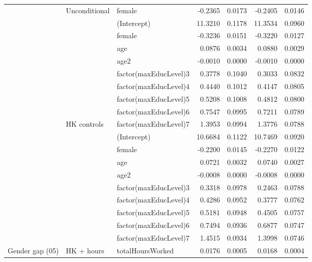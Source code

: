 \begin{table}[H]
{\begin{tabular}[t]{lllrrrr}
 & \multirow{-2}{*}[\normalbaselineskip]{\raggedright\arraybackslash Unconditional} & female & -0.2365 & 0.0173 & -0.2405 & 0.0146\\

 &  & (Intercept) & 11.3210 & 0.1178 & 11.3534 & 0.0960\\

 &  & female & -0.3236 & 0.0151 & -0.3220 & 0.0127\\

 &  & age & 0.0876 & 0.0034 & 0.0880 & 0.0029\\

 &  & age2 & -0.0010 & 0.0000 & -0.0010 & 0.0000\\

 &  & factor(maxEducLevel)3 & 0.3778 & 0.1040 & 0.3033 & 0.0832\\

 &  & factor(maxEducLevel)4 & 0.4440 & 0.1012 & 0.4147 & 0.0805\\

 &  & factor(maxEducLevel)5 & 0.5208 & 0.1008 & 0.4812 & 0.0800\\

 &  & factor(maxEducLevel)6 & 0.7547 & 0.0995 & 0.7211 & 0.0789\\

 & \multirow{-9}{*}[\normalbaselineskip]{\raggedright\arraybackslash HK controls} & factor(maxEducLevel)7 & 1.3953 & 0.0994 & 1.3776 & 0.0788\\

 &  & (Intercept) & 10.6684 & 0.1122 & 10.7469 & 0.0920\\

 &  & female & -0.2200 & 0.0145 & -0.2270 & 0.0122\\

 &  & age & 0.0721 & 0.0032 & 0.0740 & 0.0027\\

 &  & age2 & -0.0008 & 0.0000 & -0.0008 & 0.0000\\

 &  & factor(maxEducLevel)3 & 0.3318 & 0.0978 & 0.2463 & 0.0788\\

 &  & factor(maxEducLevel)4 & 0.4286 & 0.0952 & 0.3777 & 0.0762\\

 &  & factor(maxEducLevel)5 & 0.5181 & 0.0948 & 0.4505 & 0.0757\\

 &  & factor(maxEducLevel)6 & 0.7494 & 0.0936 & 0.6877 & 0.0747\\

 &  & factor(maxEducLevel)7 & 1.4515 & 0.0934 & 1.3998 & 0.0746\\

\multirow{-21}{*}[\normalbaselineskip]{\raggedright\arraybackslash Gender gap (05)} & \multirow{-10}{*}[\normalbaselineskip]{\raggedright\arraybackslash HK + hours} & totalHoursWorked & 0.0176 & 0.0005 & 0.0168 & 0.0004\\
\bottomrule
\end{tabular}}
\end{table}
